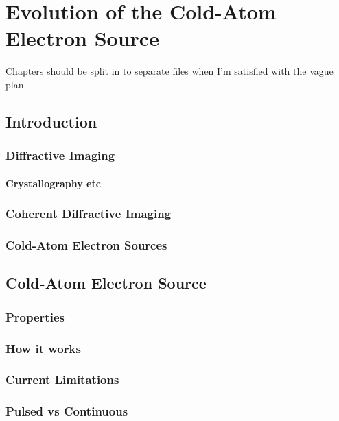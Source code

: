 \part{Evolution of the Cold-Atom Electron Source}

Chapters should be split in to separate files when I'm satisfied with the vague plan.

\chapter{Introduction}

\section{Diffractive Imaging}

\subsection{Crystallography etc}

\section{Coherent Diffractive Imaging}

\section{Cold-Atom Electron Sources}




\chapter{Cold-Atom Electron Source}\label{chapter:setup}

\section{Properties}

\section{How it works}

\section{Current Limitations}

\section{Pulsed vs Continuous}

